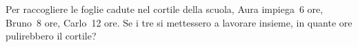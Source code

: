 \begin{htmulticols}{2}
\begin{esercizio}
Per raccogliere le foglie cadute nel cortile
della scuola, Aura impiega~6 ore, Bruno~8 ore,
Carlo~12 ore. Se i tre si mettessero a lavorare
insieme, in quante ore pulirebbero il cortile?
\end{esercizio}

% 
% 


\end{htmulticols}
